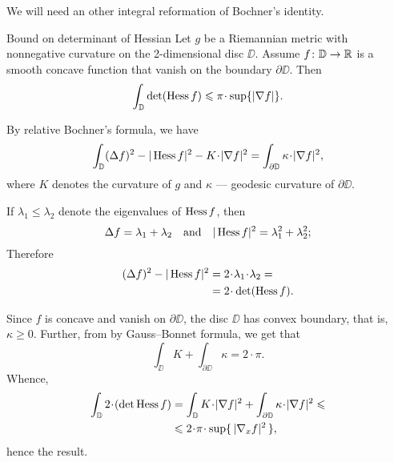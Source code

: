 We will need an other integral reformation of Bochner's identity.

\begin{thm}{Bound on determinant of Hessian}
Let $g$ be a Riemannian metric with nonnegative curvature on the 2-dimensional disc $\DD$.
Assume $f\:\DD\zz\to \RR$ is a smooth concave function that vanish on the boundary $\partial \DD$.
Then 
\[\int_\DD \det(\Hess f)\le \pi\cdot \sup\{|\nabla f|\}. \]
\end{thm}

By relative Bochner's formula, we have
\[\int_\DD(\Delta f)^2-|\Hess f|^2-K\cdot |\nabla f|^2=\int_{\partial\DD} \kappa\cdot |\nabla f|^2,\]
where $K$ denotes the curvature of $g$ and $\kappa$ --- geodesic curvature of $\partial\DD$.

If $\lambda_1\le \lambda_2$ denote the eigenvalues of $\operatorname{Hess} f$,
then 
\[\Delta f=\lambda_1+\lambda_2\quad\text{and}\quad |\operatorname{Hess} f|^2=\lambda_1^2+\lambda_2^2;\]
Therefore 
\begin{align*}
(\Delta f)^2-|\Hess f|^2&=2\cdot\lambda_1\cdot \lambda_2=
\\
&=2\cdot\det(\Hess f).
\end{align*}

Since $f$ is concave and vanish on $\partial\DD$, the disc $\DD$ has convex boundary, that is, $\kappa\ge 0$.
Further, from by Gauss--Bonnet formula, we get that
\[\int_\DD K+\int_{\partial\DD} \kappa =2\cdot \pi.\]
Whence, 
\begin{align*}
\int_\DD 2\cdot(\det\Hess f)
&=
\int_\DD K\cdot |\nabla f|^2
+
\int_{\partial\DD} \kappa\cdot |\nabla f|^2\le 
\\
&\le 2\cdot \pi \cdot \sup\{\,|\nabla_x f|^2\,\},
\end{align*}
hence the result. 
\qeds
